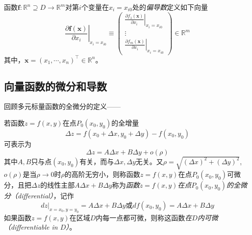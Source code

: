 \documentclass[main.tex]{subfiles}
\begin{document}
\begin{definition}[向量函数的偏导数]\label{def:II.4.11}
    函数$\mathbf{f}:\mathbb{R}^n\supseteq D\rightarrow\mathbb{R}^m$对第$i$个变量在$x_i=x_{i0}$处的\emph{偏导数}定义如下向量
    \[
        \left.\frac{\partial \mathbf{f}\left(\mathbf{x}\right)}{\partial x_i}\right|_{x_i=x_{i0}}\equiv\left(\begin{array}{c}
                \left.\frac{\partial f_1\left(\mathbf{x}\right)}{\partial x_i}\right|_{x_i=x_{i0}} \\
                \vdots                                                                             \\
                \left.\frac{\partial f_m\left(\mathbf{x}\right)}{\partial x_i}\right|_{x_i=x_{i0}}\end{array}\right)\in\mathbb{R}^m
    \]
    其中，$\mathbf{x}=\left(x_1,\cdots,x_n\right)^\intercal\in\mathbb{R}^n$。
\end{definition}


\subsection{向量函数的微分和导数}
回顾多元标量函数的全微分的定义\cite[“定义7.3.1”,p.~19]{华工高数2009下}——

\begin{definition}[多元标量值函数的微分]\label{def:II.4.12}
    若函数$z=f\left(x,y\right)$在点$P_0\left(x_0,y_0\right)$的全增量
    \[
        \Delta z=f\left(x_0+\Delta x,y_0+\Delta y\right)-f\left(x_0,y_0\right)
    \]
    可表示为
    \[
        \Delta z=A \Delta x+ B \Delta y+o\left(\rho\right)
    \]
    其中$A,B$只与点$\left(x_0,y_0\right)$有关，而与$\Delta x,\Delta y$无关。又$\rho=\sqrt{\left(\Delta x\right)^2+\left(\Delta y\right)^2}$,$o\left(\rho\right)$是当$\rho\rightarrow 0$时$\rho$的高阶无穷小，则称函数$z=f\left(x,y\right)$在点$P_0\left(x_0,y_0\right)$可微分，且把$\Delta z$的线性主部$A\Delta x+B\Delta y$称为\emph{函数$z=f\left(x,y\right)$在点$P_0\left(x_0,y_0\right)$的全微分（differential）}，记作
    \[
        \left.dz\right|_{x=x_0,y=y_0}=A\Delta x+B\Delta y\text{或}df\left(x_0,y_0\right)=A\Delta x+B\Delta y
    \]
    如果函数$z=f\left(x,y\right)$在区域$D$内每一点都可微，则称这函数\emph{在$D$内可微（differentiable in $D$）}。
\end{definition}
\end{document}

